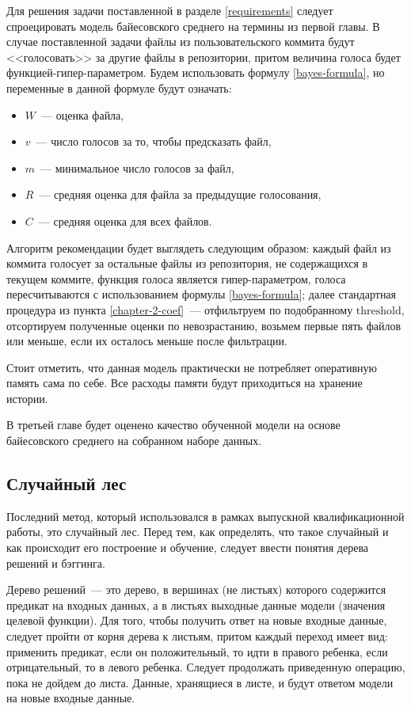 Для решения задачи поставленной в разделе \ref{requirements} следует спроецировать модель байесовского среднего на термины из первой главы. В случае поставленной задачи файлы из пользовательского коммита будут <<голосовать>> за другие файлы в репозитории, притом величина голоса будет функцией-гипер-параметром. Будем использовать формулу \ref{bayes-formula}, но переменные в данной формуле будут означать:
\begin{itemize}
    \item $W$~--- оценка файла,
    \item $v$~--- число голосов за то, чтобы предсказать файл,
    \item $m$~--- минимальное число голосов за файл,
    \item $R$~--- средняя оценка для файла за предыдущие голосования,
    \item ${C}$~--- средняя оценка для всех файлов.
\end{itemize}

Алгоритм рекомендации будет выглядеть следующим образом: каждый файл из коммита голосует за остальные файлы из репозитория, не содержащихся в текущем коммите, функция голоса является гипер-параметром, голоса пересчитываются с использованием формулы \ref{bayes-formula}; далее стандартная процедура из пункта \ref{chapter-2-coef}~--- отфильтруем по подобранному $\text{threshold}$, отсортируем полученные оценки по невозрастанию, возьмем первые пять файлов или меньше, если их осталось меньше после фильтрации.

Стоит отметить, что данная модель практически не потребляет оперативную память сама по себе. Все расходы памяти будут приходиться на хранение истории.

В третьей главе будет оценено качество обученной модели на основе байесовского среднего на собранном наборе данных.
    \subsection{Случайный лес}\label{chapter2-forest}
Последний метод, который использовался в рамках выпускной квалификационной работы, это случайный лес. Перед тем, как определять, что такое случайный и как происходит его построение и обучение, следует ввести понятия дерева решений и бэггинга.

Дерево решений~--- это дерево, в вершинах (не листьях) которого содержится предикат на входных данных, а в листьях выходные данные модели (значения целевой функции). Для того, чтобы получить ответ на новые входные данные, следует пройти от корня дерева к листьям, притом каждый переход имеет вид: применить предикат, если он положительный, то идти в правого ребенка, если отрицательный, то в левого ребенка. Следует продолжать приведенную операцию, пока не дойдем до листа. Данные, хранящиеся в листе, и будут ответом модели на новые входные данные.

